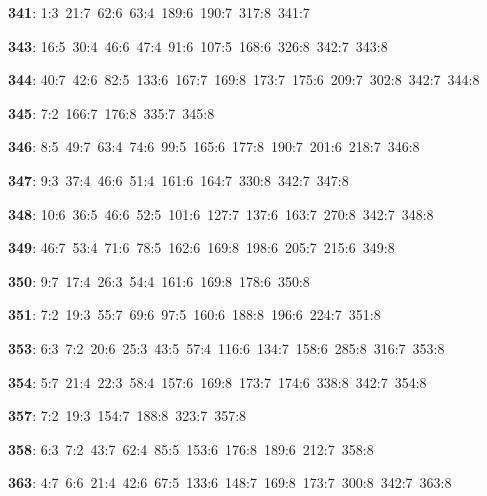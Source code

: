 \noindent \textbf{341}: 1:3\allowbreak\ 21:7\allowbreak\ 62:6\allowbreak\ 63:4\allowbreak\ 189:6\allowbreak\ 190:7\allowbreak\ 317:8\allowbreak\ 341:7\par
\noindent \textbf{343}: 16:5\allowbreak\ 30:4\allowbreak\ 46:6\allowbreak\ 47:4\allowbreak\ 91:6\allowbreak\ 107:5\allowbreak\ 168:6\allowbreak\ 326:8\allowbreak\ 342:7\allowbreak\ 343:8\par
\noindent \textbf{344}: 40:7\allowbreak\ 42:6\allowbreak\ 82:5\allowbreak\ 133:6\allowbreak\ 167:7\allowbreak\ 169:8\allowbreak\ 173:7\allowbreak\ 175:6\allowbreak\ 209:7\allowbreak\ 302:8\allowbreak\ 342:7\allowbreak\ 344:8\par
\noindent \textbf{345}: 7:2\allowbreak\ 166:7\allowbreak\ 176:8\allowbreak\ 335:7\allowbreak\ 345:8\par
\noindent \textbf{346}: 8:5\allowbreak\ 49:7\allowbreak\ 63:4\allowbreak\ 74:6\allowbreak\ 99:5\allowbreak\ 165:6\allowbreak\ 177:8\allowbreak\ 190:7\allowbreak\ 201:6\allowbreak\ 218:7\allowbreak\ 346:8\par
\noindent \textbf{347}: 9:3\allowbreak\ 37:4\allowbreak\ 46:6\allowbreak\ 51:4\allowbreak\ 161:6\allowbreak\ 164:7\allowbreak\ 330:8\allowbreak\ 342:7\allowbreak\ 347:8\par
\noindent \textbf{348}: 10:6\allowbreak\ 36:5\allowbreak\ 46:6\allowbreak\ 52:5\allowbreak\ 101:6\allowbreak\ 127:7\allowbreak\ 137:6\allowbreak\ 163:7\allowbreak\ 270:8\allowbreak\ 342:7\allowbreak\ 348:8\par
\noindent \textbf{349}: 46:7\allowbreak\ 53:4\allowbreak\ 71:6\allowbreak\ 78:5\allowbreak\ 162:6\allowbreak\ 169:8\allowbreak\ 198:6\allowbreak\ 205:7\allowbreak\ 215:6\allowbreak\ 349:8\par
\noindent \textbf{350}: 9:7\allowbreak\ 17:4\allowbreak\ 26:3\allowbreak\ 54:4\allowbreak\ 161:6\allowbreak\ 169:8\allowbreak\ 178:6\allowbreak\ 350:8\par
\noindent \textbf{351}: 7:2\allowbreak\ 19:3\allowbreak\ 55:7\allowbreak\ 69:6\allowbreak\ 97:5\allowbreak\ 160:6\allowbreak\ 188:8\allowbreak\ 196:6\allowbreak\ 224:7\allowbreak\ 351:8\par
\noindent \textbf{353}: 6:3\allowbreak\ 7:2\allowbreak\ 20:6\allowbreak\ 25:3\allowbreak\ 43:5\allowbreak\ 57:4\allowbreak\ 116:6\allowbreak\ 134:7\allowbreak\ 158:6\allowbreak\ 285:8\allowbreak\ 316:7\allowbreak\ 353:8\par
\noindent \textbf{354}: 5:7\allowbreak\ 21:4\allowbreak\ 22:3\allowbreak\ 58:4\allowbreak\ 157:6\allowbreak\ 169:8\allowbreak\ 173:7\allowbreak\ 174:6\allowbreak\ 338:8\allowbreak\ 342:7\allowbreak\ 354:8\par
\noindent \textbf{357}: 7:2\allowbreak\ 19:3\allowbreak\ 154:7\allowbreak\ 188:8\allowbreak\ 323:7\allowbreak\ 357:8\par
\noindent \textbf{358}: 6:3\allowbreak\ 7:2\allowbreak\ 43:7\allowbreak\ 62:4\allowbreak\ 85:5\allowbreak\ 153:6\allowbreak\ 176:8\allowbreak\ 189:6\allowbreak\ 212:7\allowbreak\ 358:8\par
\noindent \textbf{363}: 4:7\allowbreak\ 6:6\allowbreak\ 21:4\allowbreak\ 42:6\allowbreak\ 67:5\allowbreak\ 133:6\allowbreak\ 148:7\allowbreak\ 169:8\allowbreak\ 173:7\allowbreak\ 300:8\allowbreak\ 342:7\allowbreak\ 363:8\par

